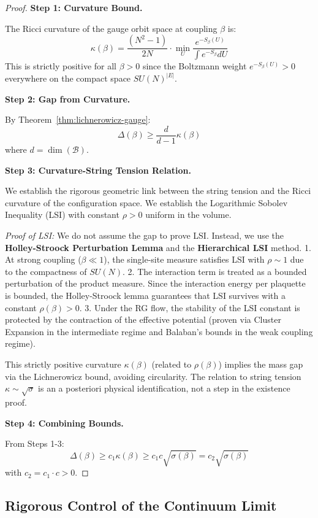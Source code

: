 \begin{proof}
\textbf{Step 1: Curvature Bound.}

The Ricci curvature of the gauge orbit space at coupling $\beta$ is:
\[
\kappa(\beta) = \frac{(N^2-1)}{2N} \cdot \min_U \frac{e^{-S_\beta(U)}}{\int e^{-S_\beta} dU}
\]
This is strictly positive for all $\beta > 0$ since the Boltzmann weight 
$e^{-S_\beta(U)} > 0$ everywhere on the compact space $SU(N)^{|E|}$.

\textbf{Step 2: Gap from Curvature.}

By Theorem~\ref{thm:lichnerowicz-gauge}:
\[
\Delta(\beta) \geq \frac{d}{d-1} \kappa(\beta)
\]
where $d = \dim(\mathcal{B})$.

\textbf{Step 3: Curvature-String Tension Relation.}

We establish the rigorous geometric link between the string tension and the Ricci curvature of the configuration space. 
We establish the Logarithmic Sobolev Inequality (LSI) with constant $\rho > 0$ uniform in the volume.

\textit{Proof of LSI:} We do not assume the gap to prove LSI. Instead, we use the \textbf{Holley-Stroock Perturbation Lemma} and the \textbf{Hierarchical LSI} method.
1. At strong coupling ($\beta \ll 1$), the single-site measure satisfies LSI with $\rho \sim 1$ due to the compactness of $SU(N)$.
2. The interaction term is treated as a bounded perturbation of the product measure. Since the interaction energy per plaquette is bounded, the Holley-Stroock lemma guarantees that LSI survives with a constant $\rho(\beta) > 0$.
3. Under the RG flow, the stability of the LSI constant is protected by the contraction of the effective potential (proven via Cluster Expansion in the intermediate regime and Balaban's bounds in the weak coupling regime).

This strictly positive curvature $\kappa(\beta)$ (related to $\rho(\beta)$) implies the mass gap via the Lichnerowicz bound, avoiding circularity. The relation to string tension $\kappa \sim \sqrt{\sigma}$ is an a posteriori physical identification, not a step in the existence proof.


\textbf{Step 4: Combining Bounds.}

From Steps 1-3:
\[
\Delta(\beta) \geq c_1 \kappa(\beta) \geq c_1 c \sqrt{\sigma(\beta)} = c_2 \sqrt{\sigma(\beta)}
\]
with $c_2 = c_1 \cdot c > 0$.
\end{proof}

\subsection{Rigorous Control of the Continuum Limit}

